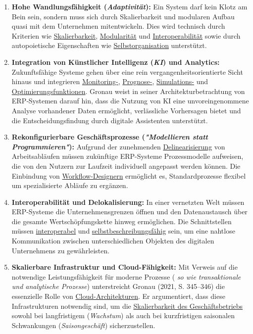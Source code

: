 \begin{enumerate}[label=\arabic*.), leftmargin=*]
    \item \textbf{Hohe Wandlungsfähigkeit (\textit{Adaptivität}):} Ein System darf kein Klotz am Bein sein, sondern muss sich durch Skalierbarkeit und modularen Aufbau quasi mit dem Unternehmen mitentwickeln. Dies wird technisch durch Kriterien wie \uline{Skalierbarkeit}, \uline{Modularität} und \uline{Interoperabilität} sowie durch autopoietische Eigenschaften wie \uline{Selbstorganisation} unterstützt.
    \item \textbf{Integration von Künstlicher Intelligenz (\textit{\acs{KI}}) und Analytics:} Zukunftsfähige Systeme gehen über eine rein vergangenheitsorientierte Sicht hinaus und integrieren \uline{Monitoring-}, \uline{Prognose-}, \uline{Simulations-} und \uline{Optimierungsfunktionen}. Gronau \cite[340]{2} weist in seiner Architekturbetrachtung von \acs{ERP}‑Systemen darauf hin, dass die Nutzung von \acs{KI} eine unvoreingenommene Analyse vorhandener Daten ermöglicht, verlässliche Vorhersagen bietet und die Entscheidungsfindung durch digitale Assistenten unterstützt.
    \item \textbf{Rekonfigurierbare Geschäftsprozesse (\textit{"Modellieren statt Programmieren"}):} Aufgrund der zunehmenden \uline{Delinearisierung} von Arbeitsabläufen müssen zukünftige \acs{ERP}-Systeme Prozessmodelle aufweisen, die von den Nutzern zur Laufzeit individuell angepasst werden können. Die Einbindung von \uline{Workflow-Designern} ermöglicht es, Standardprozesse flexibel um spezialisierte Abläufe zu ergänzen.
    \item \textbf{Interoperabilität und Delokalisierung:} In einer vernetzten Welt müssen \acs{ERP}-Systeme die Unternehmensgrenzen öffnen und den Datenaustausch über die gesamte Wertschöpfungskette hinweg ermöglichen. Die Schnittstellen müssen \uline{interoperabel} und \uline{selbstbeschreibungsfähig} sein, um eine nahtlose Kommunikation zwischen unterschiedlichen Objekten des digitalen Unternehmens zu gewährleisten.
    \item \textbf{Skalierbare Infrastruktur und Cloud-Fähigkeit:} Mit Verweis auf die notwendige Leistungsfähigkeit für moderne Prozesse (\textit{ so wie transaktionale und analytische Prozesse}) unterstreicht Gronau (2021, S. 345–346) die essenzielle Rolle von \uline{Cloud-Architekturen}. Er argumentiert, dass diese Infrastrukturen notwendig sind, um die \uline{Skalierbarkeit des Geschäftsbetriebs} sowohl bei langfristigem (\textit{Wachstum}) als auch bei kurzfristigen saisonalen Schwankungen (\textit{Saisongeschäft}) sicherzustellen.
\end{enumerate}
